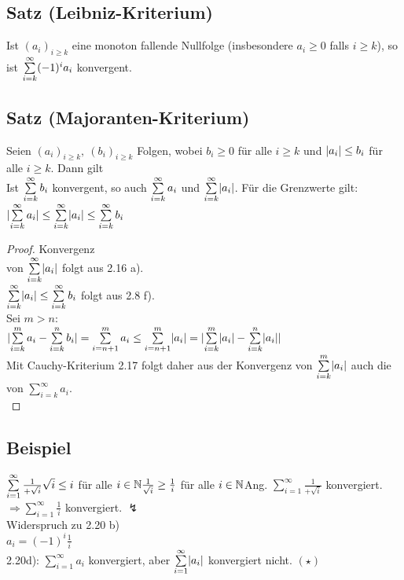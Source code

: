 \subsection{Satz (Leibniz-Kriterium)}
Ist $(a_i)_{i \geq k}$ eine monoton fallende Nullfolge (insbesondere $a_i \geq 0$ falls $i \geq k$), so ist $\sum\limits_{i=k}^{\infty} (-1)^i a_i$ konvergent.
\subsection{Satz (Majoranten-Kriterium)}
Seien $(a_i)_{i \geq k}, \ (b_i)_{i \geq k}$ Folgen, wobei $b_i \geq 0$ für alle $i \geq k$ und $\lvert a_i \rvert \leq b_i$ für alle $i \geq k$. Dann gilt\\
Ist $\sum\limits_{i=k}^{\infty} b_i$ konvergent, so auch $\sum\limits_{i=k}^{\infty} a_i$ und $\sum\limits_{i=k}^{\infty} \lvert a_i \rvert$. Für die Grenzwerte gilt:\\
$\lvert \sum\limits_{i=k}^{\infty} a_i \rvert \leq \sum\limits_{i=k}^{\infty} \lvert a_i \rvert \leq \sum\limits_{i=k}^{\infty} b_i$
\begin{proof}
Konvergenz\\
von $\sum\limits_{i=k}^{\infty} \lvert a_i \rvert$ folgt aus 2.16 a).\\
$\sum\limits_{i=k}^{\infty} \lvert a_i \rvert \leq \sum\limits_{i=k}^{\infty} b_i$ folgt aus 2.8 f).\\
Sei $m > n$:\\
$\lvert \sum\limits_{i = k}^{m} a_i - \sum\limits_{i=k}^{n} b_i \rvert = \sum\limits_{i = n+ 1}^{m} a_i \leq \sum\limits_{i = n+1}^{m} \lvert a_i \rvert = \lvert \sum\limits_{i=k}^{m} \lvert a_i \rvert-\sum\limits_{i=k}^{n} \lvert a_i \rvert \rvert$\\
Mit Cauchy-Kriterium 2.17 folgt daher aus der Konvergenz von $\sum\limits_{i=k}^{m} \lvert a_i \rvert$ auch die von $\sum\limits_{i=k}^{\infty} a_i$.\\
\end{proof}
\subsection{Beispiel}
$\sum\limits_{i=1}^{\infty} \frac{1}{+\sqrt{i}}
\\\sqrt{i} \leq i$ für alle $i \in \mathbb{N}\\
\frac{1}{\sqrt{i}} \geq \frac{1}{i}$ für alle $i \in \mathbb{N}\\
$Ang. $\sum\limits_{i=1}^{\infty} \frac{1}{+\sqrt{i}}$ konvergiert.
$\Rightarrow \sum\limits_{i=1}^{\infty} \frac{1}{i}$ konvergiert. $\lightning$\\
Widerspruch zu 2.20 b)
\bigskip\\
$a_i = (-1)^i \frac{1}{i}$\\
2.20d): $\sum\limits_{i=1}^{\infty} a_i$ konvergiert,
aber $\sum\limits_{i=1}^{\infty} \lvert a_i \rvert$ konvergiert nicht. $(\star)$
